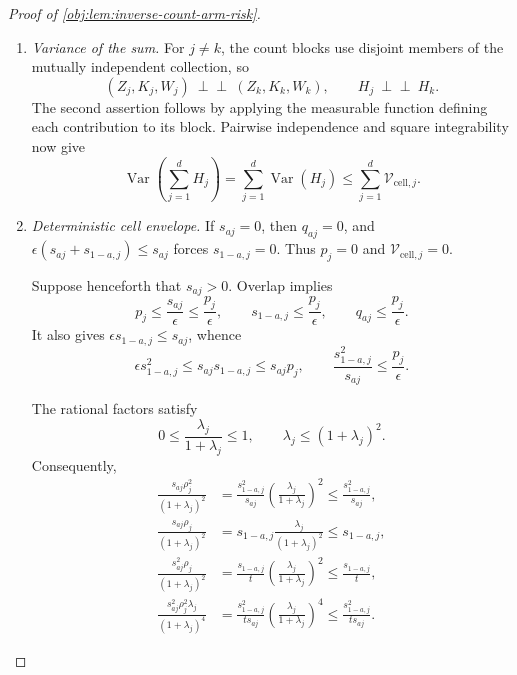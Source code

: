 \documentclass[11pt]{article}
\begin{document}
\begin{proof}[Proof of \cref{obj:lem:inverse-count-arm-risk}]
\begin{enumerate}
\item \emph{Variance of the sum.}
For \(j\ne k\), the count blocks use disjoint members of the mutually
independent collection, so
\[
(Z_j,K_j,W_j)\ \perp\!\!\!\perp\ (Z_k,K_k,W_k),
\qquad
H_j\ \perp\!\!\!\perp\ H_k.
\]
The second assertion follows by applying the measurable function defining
each contribution to its block. Pairwise independence and square
integrability now give
\[
\operatorname{Var}\!\left(\sum_{j=1}^{d}H_j\right)
=\sum_{j=1}^{d}\operatorname{Var}(H_j)
\le\sum_{j=1}^{d}\mathcal V_{\mathrm{cell},j}.
\]

\item \emph{Deterministic cell envelope.}
If \(s_{aj}=0\), then \(q_{aj}=0\), and
\(\epsilon(s_{aj}+s_{1-a,j})\le s_{aj}\) forces
\(s_{1-a,j}=0\). Thus \(p_j=0\) and
\(\mathcal V_{\mathrm{cell},j}=0\).

Suppose henceforth that \(s_{aj}>0\). Overlap implies
\[
p_j\le\frac{s_{aj}}\epsilon\le\frac{p_j}\epsilon,
\qquad
s_{1-a,j}\le\frac{p_j}\epsilon,
\qquad
q_{aj}\le\frac{p_j}\epsilon.
\]
It also gives \(\epsilon s_{1-a,j}\le s_{aj}\), whence
\[
\epsilon s_{1-a,j}^2
\le s_{aj}s_{1-a,j}
\le s_{aj}p_j,
\qquad
\frac{s_{1-a,j}^2}{s_{aj}}\le\frac{p_j}\epsilon.
\]

The rational factors satisfy
\[
0\le\frac{\lambda_j}{1+\lambda_j}\le1,
\qquad
\lambda_j\le(1+\lambda_j)^2.
\]
Consequently,
\[
\begin{aligned}
\frac{s_{aj}\rho_j^2}{(1+\lambda_j)^2}
&=\frac{s_{1-a,j}^2}{s_{aj}}
  \left(\frac{\lambda_j}{1+\lambda_j}\right)^2
\le\frac{s_{1-a,j}^2}{s_{aj}},\\
\frac{s_{aj}\rho_j}{(1+\lambda_j)^2}
&=s_{1-a,j}\frac{\lambda_j}{(1+\lambda_j)^2}
\le s_{1-a,j},\\
\frac{s_{aj}^2\rho_j}{(1+\lambda_j)^2}
&=\frac{s_{1-a,j}}t
  \left(\frac{\lambda_j}{1+\lambda_j}\right)^2
\le\frac{s_{1-a,j}}t,\\
\frac{s_{aj}^2\rho_j^2\lambda_j}{(1+\lambda_j)^4}
&=\frac{s_{1-a,j}^2}{t s_{aj}}
  \left(\frac{\lambda_j}{1+\lambda_j}\right)^4
\le\frac{s_{1-a,j}^2}{t s_{aj}}.
\end{aligned}
\]


\end{enumerate}
\end{proof}
\end{document}
